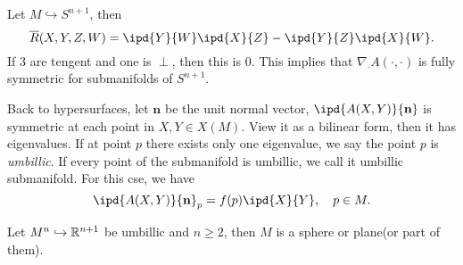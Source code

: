 \begin{example}
  Let $M\hookrightarrow S^{n+1}$, then 
\[
  \overline{R}(X,Y,Z,W)=\ipd{Y}{W}\ipd{X}{Z}-\ipd{Y}{Z}\ipd{X}{W}.
\] 
If $3$ are tengent and one is $\perp$, then this is $0$. This implies that $\nabla _{\cdot }A(\cdot ,\cdot )$ is fully symmetric for submanifolds of $S^{n+1}$.
\end{example}
Back to hypersurfaces, let $\mathbf{n}$ be the unit normal vector, $\ipd{A(X,Y)}{\mathbf{n}}$ is symmetric at each point in $X,Y\in X(M)$. View it as a bilinear form, then it has eigenvalues. If at point $p$ there exists only one eigenvalue, we say the point $p$ is \textit{umbillic}. If every point of the  submanifold is umbillic, we call it umbillic submanifold. For this cse, we have
\[
  \ipd{A(X,Y)}{\mathbf{n}}_p=f(p)\ipd{X}{Y},\quad p\in M.
\] 
\begin{theorem}
  Let $M^n\hookrightarrow \mathbb{R}^{n+1}$ be umbillic and $n\ge 2$, then $M$ is a sphere or plane(or part of them).
\end{theorem}
